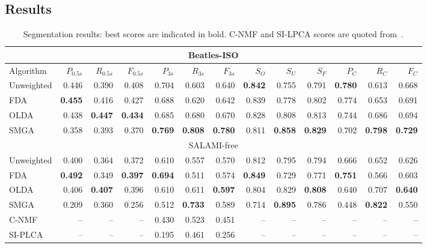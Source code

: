 \documentclass{article}
\begin{document}
\subsection{Results}
\label{sec:results}
\begin{table}
\centering
\caption{Segmentation results: best scores are indicated in bold. C-NMF and SI-LPCA scores are quoted from~\cite{nieto2013convex}.\label{tab:results}}
\footnotesize
\begin{tabular}{lrrrrrrrrrrrr}
\multicolumn{13}{c}{Beatles-ISO}\\
\toprule%
Algorithm   &   $P_{0.5s}$ & $R_{0.5s}$ & $F_{0.5s}$ & $P_{3s}$     & $R_{3s}$  & $F_{3s}$   & $S_O$ & $S_U$ & $S_F$ & $P_C$& $R_C$& $F_C$\\
\hline
Unweighted  &   0.446 & 0.390 & 0.408 & 0.704   & 0.603 & 0.640 & \textbf{0.842} & 0.755 & 0.791 & \textbf{0.780} & 0.613 & 0.668\\
FDA         &   \textbf{0.455} & 0.416 & 0.427 & 0.688 & 0.620 & 0.642 & 0.839 & 0.778 & 0.802 & 0.774 & 0.653 & 0.691\\
OLDA        &   0.438 & \textbf{0.447} & \textbf{0.434} & 0.685   & 0.680 & 0.670 & 0.828 & 0.808 & 0.813 & 0.744 & 0.686 & 0.694\\
\hline
SMGA~\hfill\cite{serra2012unsupervised}
            &   0.358 & 0.393 & 0.370 & \textbf{0.769}   & \textbf{0.808} & \textbf{0.780} & 0.811 & \textbf{0.858} & \textbf{0.829} & 0.702 & \textbf{0.798} &
            \textbf{0.729}\\
\toprule%
\multicolumn{13}{c}{SALAMI-free}\\
\toprule%
Unweighted  & 0.400 & 0.364 & 0.372 & 0.610 & 0.557 & 0.570 & 0.812 & 0.795 & 0.794 & 0.666 & 0.652 & 0.626\\
FDA     &  \textbf{0.492} & 0.349 & \textbf{0.397} & \textbf{0.694} & 0.511 & 0.574 & \textbf{0.849} & 0.729 & 0.771 &
\textbf{0.751} & 0.566 & 0.603\\
OLDA    &  0.406 & \textbf{0.407} & 0.396 & 0.610 & 0.611 & \textbf{0.597} & 0.804 & 0.829 & \textbf{0.808} & 0.640 & 0.707 & \textbf{0.640}\\
\hline
SMGA~\hfill\cite{serra2012unsupervised}
        & 0.209 & 0.360 & 0.256 & 0.512 & \textbf{0.733} & 0.589 & 0.714 & \textbf{0.895} & 0.786 & 0.448 & \textbf{0.822} & 0.550\\
C-NMF~\hfill\cite{nieto2013convex}            
        & -- & -- & -- & 0.430 & 0.523 & 0.451 & -- & -- & -- & -- & -- & -- \\
SI-PLCA~\hfill\cite{weiss2011unsupervised}    
        & -- & -- & -- & 0.195 & 0.461 & 0.256 & -- & -- & -- & -- & -- & -- \\  
\bottomrule%
\end{tabular}
\end{table}
\end{document}
